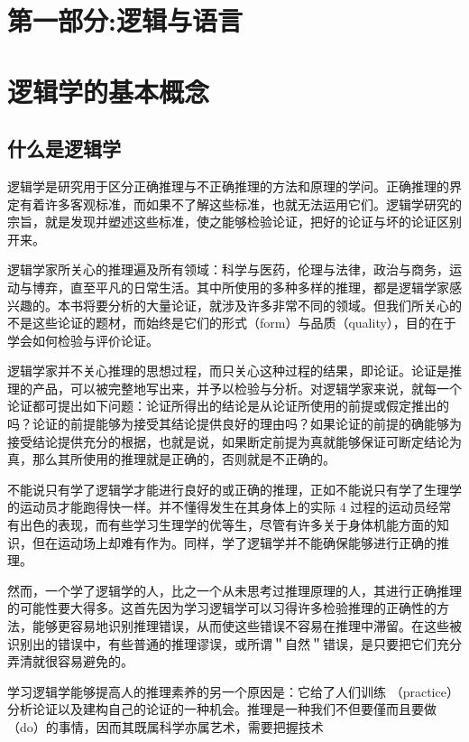 \section{第一部分:逻辑与语言}

\section{逻辑学的基本概念}

\subsection{什么是逻辑学}
逻辑学是研究用于区分正确推理与不正确推理的方法和原理的学问。正确推理的界定有着许多客观标准，而如果不了解这些标准，也就无法运用它们。逻辑学研究的宗旨，就是发现并塑述这些标准，使之能够检验论证，把好的论证与坏的论证区别开来。

逻辑学家所关心的推理遍及所有领域：科学与医药，伦理与法律，政治与商务，运动与博弃，直至平凡的日常生活。其中所使用的多种多样的推理，都是逻辑学家感兴趣的。本书将要分析的大量论证，就涉及许多非常不同的领域。但我们所关心的不是这些论证的题材，而始终是它们的形式（form）与品质（quality），目的在于学会如何检验与评价论证。

逻辑学家并不关心推理的思想过程，而只关心这种过程的结果，即论证。论证是推理的产品，可以被完整地写出来，并予以检验与分析。对逻辑学家来说，就每一个论证都可提出如下问题：论证所得出的结论是从论证所使用的前提或假定推出的吗？论证的前提能够为接受其结论提供良好的理由吗？如果论证的前提的确能够为接受结论提供充分的根据，也就是说，如果断定前提为真就能够保证可断定结论为真，那么其所使用的推理就是正确的，否则就是不正确的。

不能说只有学了逻辑学才能进行良好的或正确的推理，正如不能说只有学了生理学的运动员才能跑得快一样。并不懂得发生在其身体上的实际 4 过程的运动员经常有出色的表现，而有些学习生理学的优等生，尽管有许多关于身体机能方面的知识，但在运动场上却难有作为。同样，学了逻辑学并不能确保能够进行正确的推理。

然而，一个学了逻辑学的人，比之一个从未思考过推理原理的人，其进行正确推理的可能性要大得多。这首先因为学习逻辑学可以习得许多检验推理的正确性的方法，能够更容易地识别推理错误，从而使这些错误不容易在推理中滞留。在这些被识别出的错误中，有些普通的推理谬误，或所谓＂自然＂错误，是只要把它们充分弄清就很容易避免的。

学习逻辑学能够提高人的推理素养的另一个原因是：它给了人们训练 （practice）分析论证以及建构自己的论证的一种机会。推理是一种我们不但要僅而且要做（do）的事情，因而其既属科学亦属艺术，需要把握技术

